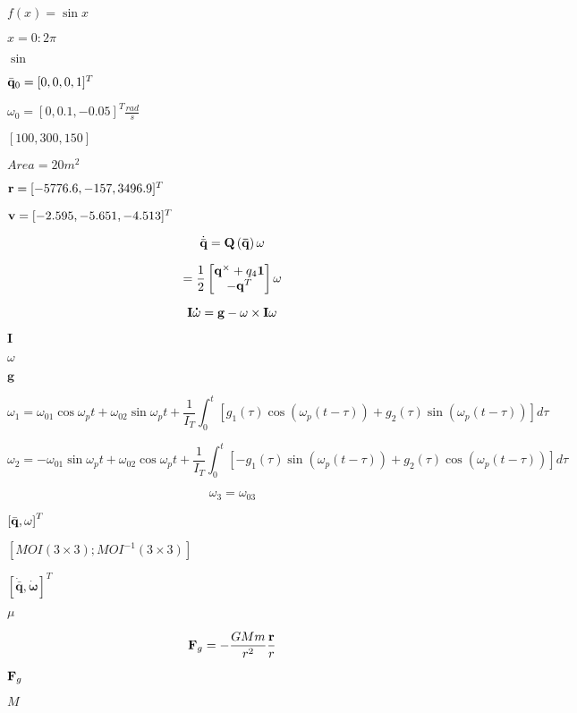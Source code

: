 \documentclass{article}
\begin{document}
$ f(x)=\sin{x}$
\pagebreak

$x=0:2\pi $
\pagebreak

$\sin{}$
\pagebreak

$\bar{\bf q}_0 = [0,0,0,1]^{T}$
\pagebreak

$\omega_{0} = [0,0.1, -0.05]^{T} \frac{rad}{s}$
\pagebreak

$[100, 300, 150]$
\pagebreak

$Area=20 m^2$
\pagebreak

${\bf r}=[-5776.6, -157, 3496.9]^{T}$
\pagebreak

${\bf v} = [-2.595, -5.651, -4.513]^{T}$
\pagebreak

\[ \dot {\bar{\bf q}} = {Q}\left(\bar{\bf q}\right){\bf \omega} \]
\pagebreak

\[ = \frac{1}{2}\begin{bmatrix} {{\bf{q}}^{\times} + q_4 {\bf 1}} \\ { - {\bf{q}}^T } \\ \end{bmatrix} {\bf \omega} \]
\pagebreak

\[ \bf{I}\dot{\bf \omega} = \bf{g} - \omega \times \bf{I}\omega \]
\pagebreak

$\textbf{I}$
\pagebreak

$\omega$
\pagebreak

$\textbf{g}$
\pagebreak

\[ \omega_{1} = \omega_{01}\cos{\omega_{p}t} + \omega_{02}\sin{\omega_{p}t} + \frac{1}{I_{T}}\int^{t}_{0}{[g_{1}(\tau)\cos{(\omega_{p}(t-\tau))}+g_{2}(\tau)\sin{(\omega_{p}(t-\tau))}]d\tau} \]
\pagebreak

\[ \omega_{2} = -\omega_{01}\sin{\omega_{p}t} + \omega_{02}\cos{\omega_{p}t} + \frac{1}{I_{T}}\int^{t}_{0}{[-g_{1}(\tau)\sin{(\omega_{p}(t-\tau))}+g_{2}(\tau)\cos{(\omega_{p}(t-\tau))}]d\tau} \]
\pagebreak

\[ \omega_{3} = \omega_{03} \]
\pagebreak

$\left[\bar{\bf q},\bf{\omega}\right]^{T}$
\pagebreak

$\left[MOI(3\times3); MOI^{-1}(3\times3)\right]$
\pagebreak

$\left[\dot{\bar{\mathbf q}},\dot{\mathbf \omega}\right]^{T}$
\pagebreak

$\mu$
\pagebreak

\[ {\bf F}_{g} = - \frac{GMm}{r^{2}}\frac{{\bf r}}{r} \]
\pagebreak

${\bf F}_{g}$
\pagebreak

$M$
\pagebreak
\end{document}
